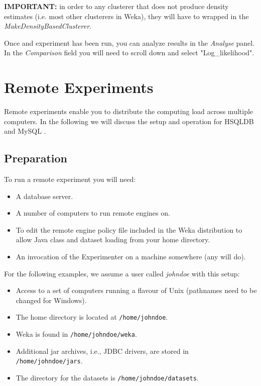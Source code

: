 \noindent \textbf{IMPORTANT:} in order to
any clusterer that does not produce density estimates (i.e. most other
clusterers in Weka), they will have to wrapped in the
\textit{MakeDensityBasedClusterer}.
\begin{center}
\end{center}

\noindent Once and experiment has been run, you can analyze results in the
\textit{Analyse} panel. In the \textit{Comparison} field you will need to scroll
down and select "Log\_likelihood".
\begin{center}
\end{center}



\newpage
\section{Remote Experiments}

Remote experiments enable you to distribute the computing load across multiple computers. In the following we will discuss the setup and operation for HSQLDB \cite{hsql} and MySQL \cite{mysql}.

\subsection{Preparation}

To run a remote experiment you will need:

\begin{itemize}
   \item A database server.
   \item A number of computers to run remote engines on.
   \item To edit the remote engine policy file included in the Weka distribution to allow Java class and dataset loading from your home directory.
   \item An invocation of the Experimenter on a machine somewhere (any will do).
\end{itemize}

\noindent For the following examples, we assume a user called \textit{johndoe} with this setup:

\begin{itemize}
	\item Access to a set of computers running a flavour of Unix (pathnames need to be changed for Windows).
   \item The home directory is located at \texttt{/home/johndoe}.
   \item Weka is found in \texttt{/home/johndoe/weka}.
   \item Additional jar archives, i.e., JDBC drivers, are stored in \texttt{/home/johndoe/jars}.
   \item The directory for the datasets is \texttt{/home/johndoe/datasets}.
\end{itemize}

